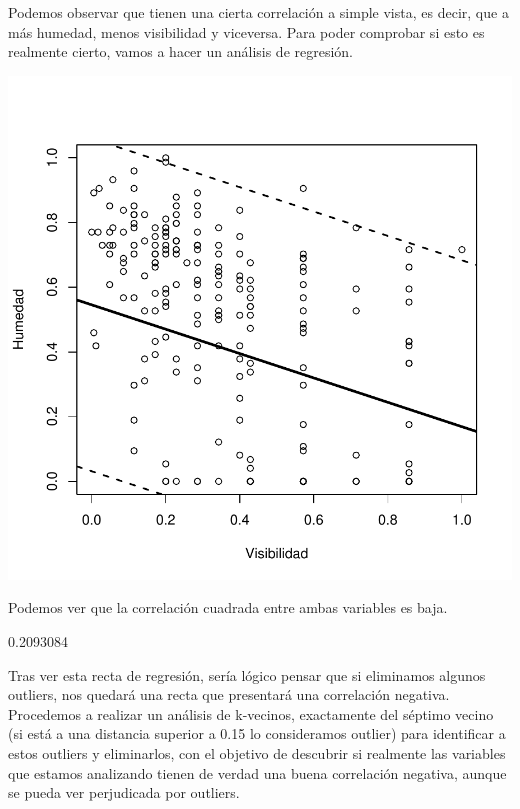 \documentclass [a4paper] {article}
\begin{document}
Podemos observar que tienen una cierta correlación a simple vista, es decir, que a más humedad, menos visibilidad y viceversa. Para poder comprobar si esto es 
realmente cierto, vamos a hacer un análisis de regresión.

\begin{center}
\includegraphics{entrega-datvishumplotregres}
\end{center}

Podemos ver que la correlación cuadrada entre ambas variables es baja.
\begin{Schunk}
\begin{Soutput}
[1] 0.2093084
\end{Soutput}
\end{Schunk}

Tras ver esta recta de regresión, sería lógico pensar que si eliminamos algunos outliers, nos quedará una recta que presentará una correlación negativa.
 Procedemos a realizar un análisis de k-vecinos, exactamente del séptimo vecino (si está a una distancia superior a 0.15 lo consideramos outlier) para identificar 
 a estos outliers y eliminarlos, con el objetivo de descubrir si realmente las variables que estamos 
 analizando tienen de verdad una buena correlación negativa, aunque se pueda ver perjudicada por outliers.
\end{document}
